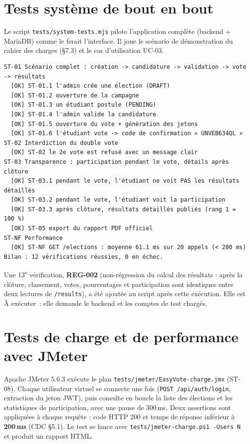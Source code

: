 \documentclass[12pt,a4paper]{report}
\newcommand{\aex}{\textcolor{paorange}{À exécuter}}
\begin{document}
\section{Tests système de bout en bout}\label{sec:systeme}
Le script \texttt{tests/system-tests.mjs} pilote l'application complète (backend + MariaDB) comme le ferait l'interface. Il joue le scénario de démonstration du cahier des charges (§7.3) et le cas d'utilisation UC-03.
\begin{lstlisting}[caption={Exécution des tests système}]
ST-01 Scénario complet : création -> candidature -> validation -> vote -> résultats
  [OK] ST-01.1 l'admin crée une élection (DRAFT)
  [OK] ST-01.2 ouverture de la campagne
  [OK] ST-01.3 un étudiant postule (PENDING)
  [OK] ST-01.4 l'admin valide la candidature
  [OK] ST-01.5 ouverture du vote + génération des jetons
  [OK] ST-01.6 l'étudiant vote -> code de confirmation « UNVEB634QL »
ST-02 Interdiction du double vote
  [OK] ST-02 le 2e vote est refusé avec un message clair
ST-03 Transparence : participation pendant le vote, détails après clôture
  [OK] ST-03.1 pendant le vote, l'étudiant ne voit PAS les résultats détaillés
  [OK] ST-03.2 pendant le vote, l'étudiant voit la participation
  [OK] ST-03.3 après clôture, résultats détaillés publiés (rang 1 = 100 %)
  [OK] ST-05 export du rapport PDF officiel
ST-NF Performance
  [OK] ST-NF GET /elections : moyenne 61.1 ms sur 20 appels (< 200 ms)
Bilan : 12 vérifications réussies, 0 en échec.
\end{lstlisting}
Une 13\textsuperscript{e} vérification, \textbf{REG-002} (non-régression du calcul des résultats : après la clôture, classement, votes, pourcentages et participation sont identiques entre deux lectures de \texttt{/results}), a été ajoutée au script après cette exécution. Elle est \aex\ : elle demande le backend et les comptes de test chargés.

\section{Tests de charge et de performance avec JMeter}
Apache JMeter 5.6.3 exécute le plan \texttt{tests/jmeter/EasyVote-charge.jmx} (ST-08). Chaque utilisateur virtuel se connecte une fois (\texttt{POST /api/auth/login}, extraction du jeton JWT), puis consulte en boucle la liste des élections et les statistiques de participation, avec une pause de 300\,ms. Deux assertions sont appliquées à chaque requête : code HTTP 200 et temps de réponse inférieur à \textbf{200\,ms} (CDC §5.1). Le test se lance avec \texttt{tests/jmeter-charge.ps1 -Users N} et produit un rapport HTML.
\end{document}
